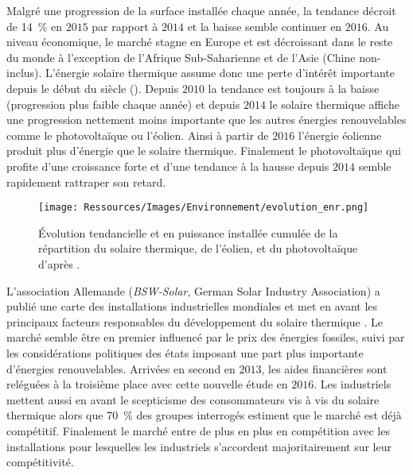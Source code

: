 Malgré une progression de la surface installée chaque année, la tendance décroit
de \SI{14}{\percent} en $2015$ par rapport à $2014$ et la baisse semble continuer en
$2016$. Au niveau économique, le marché stagne en Europe et est décroissant dans le reste
du monde à l’exception de l’Afrique Sub-Saharienne et de l’Asie (Chine non-inclus).
L’énergie solaire thermique assume donc une perte d’intérêt importante depuis le début du siècle
(). Depuis $2010$ la tendance est toujours à la baisse (progression plus
faible chaque année) et depuis $2014$ le solaire thermique affiche une progression nettement moins importante
que les autres énergies renouvelables comme le photovoltaïque ou l’éolien. Ainsi à partir
de $2016$ l’énergie éolienne produit plus d’énergie que le solaire thermique. Finalement
le photovoltaïque qui profite d’une croissance forte et d’une tendance à la hausse depuis $2014$
semble rapidement rattraper son retard.

\begin{figure}
    \centering
    \texttt{[image: Ressources/Images/Environnement/evolution\_enr.png]}
    \caption[Évolution tendancielle du solaire thermique, éolien, et photovoltaïque]
            {Évolution tendancielle et en puissance installée cumulée de la répartition
             du solaire thermique, de l’éolien, et du photovoltaïque d’après
             \textcite{Weiss2017}.}
    \label{fig:tendances_enr}
\end{figure}

L’association Allemande (\textit{BSW-Solar}, German Solar Industry Association)
a publié une carte des installations industrielles mondiales et met en avant les
principaux facteurs responsables du développement du solaire thermique \parencite{Augsten2017}.
Le  marché semble être en premier influencé par le prix des énergies fossiles, suivi par les considérations
politiques des états imposant une part plus importante d’énergies renouvelables. Arrivées
en second en $2013$, les aides financières sont reléguées à la troisième place avec
cette nouvelle étude en $2016$. Les industriels
mettent aussi en avant le scepticisme des consommateurs vis à vis du solaire thermique
alors que \SI{70}{\percent} des groupes interrogés estiment que le marché est déjà
compétitif. Finalement le marché entre de plus en plus en compétition avec les installations  pour
lesquelles les industriels s’accordent majoritairement sur leur compétitivité.



